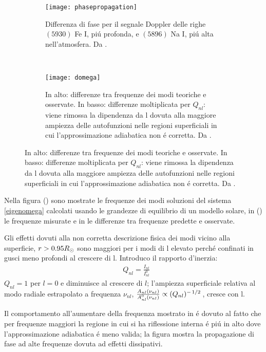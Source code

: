 \documentclass[../main.tex]{subfiles}
\begin{document}
\begin{figure}[!ht]

\begin{subfigure}[b]{0.45\textwidth}
\centering
\texttt{[image: phasepropagation]}
\caption{Differenza di fase per il segnale Doppler delle righe $(5930)$ Fe I, pi\'u profonda, e $(5896)$ Na I, pi\'u alta nell'atmosfera. Da \cite{staiger1987observations}.}\label{fig:phasedifference}
\end{subfigure}
~
\begin{subfigure}[b]{0.45\textwidth}
\centering
\texttt{[image: domega]}
\caption{In alto: differenze tra frequenze dei modi teoriche e osservate. In basso: differenze moltiplicata per $Q_{nl}$: viene rimossa la dipendenza da l dovuta alla maggiore ampiezza delle autofunzioni nelle regioni superficiali in cui l'approssimazione adiabatica non \'e corretta. Da \cite{rhodesmeasurements}.}\label{fig:nFreqdiff}
\end{subfigure}

\end{figure}

Nella figura () sono mostrate le frequenze dei modi soluzioni del sistema \eqref{eigenomega} calcolati usando le grandezze di equilibrio di un modello solare, in () le frequenze misurate e in  le differenze tra frequenze predette e osservate.

Gli effetti dovuti alla non corretta descrizione fisica dei modi vicino alla superficie, $r>0.95R_{\odot}{}$ sono maggiori per i modi di l elevato perch\'e confinati in gusci meno profondi al crescere di l. Introduco il rapporto d'inerzia:
\begin{align}
&Q_{nl}=\frac{I_{nl}}{I^0_{nl}}\label{eq:surfaceeffects}
\end{align}
$Q_{nl}=1$ per $l=0$ e diminuisce al crescere di $l$; l'ampiezza superficiale relativa al modo radiale estrapolato a frequenza $\nu_{nl}$, $\frac{A_{nl}(\nu_{nl})}{A_{nl}^0(\nu_{nl})}\propto(Q_{nl})^{-\left.{1}\middle/{2}\right.}$, cresce con l.

Il comportamento all'aumentare della frequenza mostrato in  \'e dovuto al fatto che per frequenze maggiori la regione in cui si ha riflessione interna \'e pi\'u in alto dove l'approssimazione adiabatica \'e meno valida; la figura  mostra la propagazione di fase ad alte frequenze dovuta ad effetti dissipativi.
\end{document}
